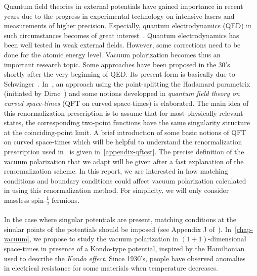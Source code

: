 Quantum field theories in external potentials have gained importance in recent years due to the progress in experimental technology on intensive lasers and measurements of higher precision.
Especially, quantum electrodynamics (QED) in such circumstances becomes of great interest~\cite{Mohr1998}. 
Quantum electrodynamics has been well tested in weak external fields.
However, some corrections need to be done for the atomic energy level. 
Vacuum polarization becomes thus an important research topic. 
Some approaches have been proposed in the 30's shortly after the very beginning of QED.
Its present form is basically due to Schwinger~\cite{Schwinger1951}. 
In~\cite{Zahn2015}, an approach using the point-splitting \wrt the Hadamard parametrix (initiated by Dirac~\cite{Dirac1934}) and some notions developped in \textit{quantum field theory on curved space-times} (QFT on curved space-times) is elaborated. 
The main idea of this renormalization prescription is to assume that for most physically relevant states,
the corresponding two-point functions have the same singularity structure at the coinciding-point limit. 
A brief introduction of some basic notions of QFT on curved space-times which will be helpful to understand the renormalization prescription used in~\cite{Zahn2015} is given in~\cref{appendix-qftcst}.
The precise definition of the vacuum polarization that we adapt will be given after a fast explanation of the renormalization scheme.
In this report, we are interested in how matching conditions and boundary conditions could affect vacuum polarization calculated in using this renormalization method. 
For simplicity,
we will only consider massless spin-$\frac 1 2$ fermions.
\\\\
%
In the case where singular potentials are present, 
matching conditions at the sinular points of the potentials should be imposed (see \eg Appendix J of~\cite{albeverio1988solvable}).
In~\cref{chap-vacuum}, we propose to study the vacuum polarization in 
$(1+1)$-dimensional space-times in presence of a Kondo-type potential, inspired by the Hamiltonian used to describe the \textit{Kondo effect}.
Since 1930's, people have observed anomalies in electrical resistance for some materials when temperature decreases. 
